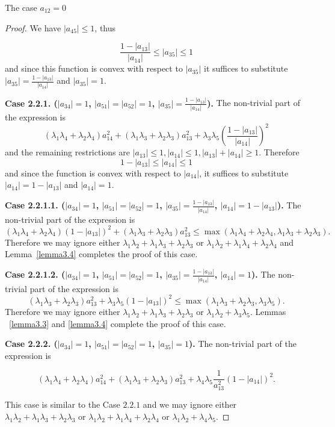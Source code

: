 \documentclass[12pt]{article}
\begin{document}
\begin{section}{The case \texorpdfstring{$a_{12} = 0$}{Lg}}
\begin{proof}
    We have $|a_{45}|\leq 1$, thus 

    $$
        \frac{1-|a_{13}|}{|a_{14}|}\leq |a_{35} | \leq 1
    $$
    and since this function is convex with respect to $|a_{35}|$ it suffices to substitute $|a_{35}| = \frac{1-|a_{13}|}{|a_{14}|}$ and $|a_{35}|=1$.

    \textbf{Case 2.2.1. ($|a_{34}|=1$, $|a_{51}|=|a_{52}|=1$, $|a_{35}| = \frac{1-|a_{13}|}{|a_{14}|}$).} The non-trivial part of the expression is 
     $$      (\lambda_{1}\lambda_{4} + \lambda_{2}\lambda_{4})a_{14}^2 + (\lambda_{1}\lambda_{3} + \lambda_{2}\lambda_{3})a_{13}^2 + \lambda_{3}\lambda_{5}\left(\frac{1-|a_{13}|}{|a_{14}|}\right)^2   $$
     and the remaining restrictions are $|a_{13}|\leq 1, |a_{14}|\leq 1, |a_{13}| + |a_{14}|\geq 1.$ Therefore $$ 1-|a_{13}|\leq |a_{14}| \leq 1$$
     and since the function is convex with respect to $|a_{14}|$, it suffices to substitute $|a_{14}| = 1 - |a_{13}|$ and $|a_{14}|=1$. 

     \textbf{Case 2.2.1.1. ($|a_{34}|=1$, $|a_{51}|=|a_{52}|=1$, $|a_{35}| = \frac{1-|a_{13}|}{|a_{14}|}$, $|a_{14}| = 1 - |a_{13}|$).} The non-trivial part of the expression is 
     $$      (\lambda_{1}\lambda_{4} + \lambda_{2}\lambda_{4})(1-|a_{13}|)^2 + (\lambda_{1}\lambda_{3} + \lambda_{2}\lambda_{3})a_{13}^2 \leq \max (\lambda_{1}\lambda_{4} + \lambda_{2}\lambda_{4}, \lambda_{1}\lambda_{3} + \lambda_{2}\lambda_{3}).   $$ 
     Therefore we may ignore  either $\lambda_{1}\lambda_{2} + \lambda_{1}\lambda_{3} + \lambda_{2}\lambda_{3}$ or $\lambda_{1}\lambda_{2} + \lambda_{1}\lambda_{4} + \lambda_{2}\lambda_{4}$ and Lemma~\ref{lemma3.4} completes the proof of this case. 

     \textbf{Case 2.2.1.2. ($|a_{34}|=1$, $|a_{51}|=|a_{52}|=1$, $|a_{35}| = \frac{1-|a_{13}|}{|a_{14}|}$, $|a_{14}| = 1$).} The non-trivial part of the expression is 
     $$       (\lambda_{1}\lambda_{3} + \lambda_{2}\lambda_{3})a_{13}^2 + \lambda_{3}\lambda_{5}(1-|a_{13}|)^2 \leq \max (\lambda_{1}\lambda_{3} + \lambda_{2}\lambda_{3}, \lambda_{3}\lambda_{5}).   $$
    Therefore we may ignore  either $\lambda_{1}\lambda_{2} + \lambda_{1}\lambda_{3} + \lambda_{2}\lambda_{3} $ or $\lambda_{1}\lambda_{2} + \lambda_{3}\lambda_{5}$. Lemmas ~\ref{lemma3.3} and \ref{lemma3.4} complete the proof of this case.
    
    \textbf{Case 2.2.2. ($|a_{34}|=1$, $|a_{51}|=|a_{52}|=1$, $|a_{35}| = 1$).} The non-trivial part of the expression is 

    $$     
 (\lambda_{1}\lambda_{4} + \lambda_{2}\lambda_{4})a_{14}^2 + (\lambda_{1}\lambda_{3} + \lambda_{2}\lambda_{3})a_{13}^2  +\lambda_{4}\lambda_{5}\frac{1}{a_{13}^2}(1-|a_{14}|)^2.   $$

 This case is similar to the Case $2.2.1$ and we may ignore either $\lambda_{1}\lambda_{2} + \lambda_{1}\lambda_{3} + \lambda_{2}\lambda_{3}$ or  $\lambda_{1}\lambda_{2} + \lambda_{1}\lambda_{4} + \lambda_{2}\lambda_{4}$ or $\lambda_{1}\lambda_{2} + \lambda_{4}\lambda_{5}.$
    \end{proof}
    
\end{section}
\end{document}
